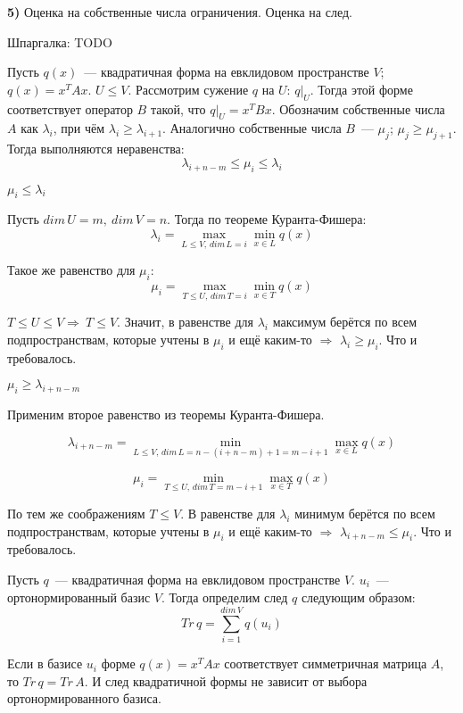 {\bf5)} Оценка на собственные числа ограничения. Оценка на след.

Шпаргалка: TODO


Пусть $q(x)$~--- квадратичная форма на евклидовом пространстве $V$; $q(x) = x^TAx$. $U \le V$. Рассмотрим сужение $q$ на $U$: $q|_U$. Тогда этой форме соответствует оператор $B$ такой, что $q|_U = x^TBx$. Обозначим собственные числа $A$ как $\lambda_i$, при чём $\lambda_i \ge \lambda_{i+1}$. Аналогично собственные числа $B$~--- $\mu_j$; $\mu_j\ge \mu_{j + 1}$. Тогда выполняются неравенства:
$$
\lambda_{i+n-m}\le\mu_i\le\lambda_i
$$

\proofname

$\mu_i\le\lambda_i$

Пусть $dim\,U = m,\ dim\,V = n$. Тогда по теореме Куранта-Фишера:
$$
\lambda_i = \max\limits_{L \le V,\,dim\,L = i} \min\limits_{x\in L} q(x) 
$$

Такое же равенство для $\mu_i$:
$$
\mu_i = \max\limits_{T \le U,\,dim\,T = i} \min\limits_{x\in T} q(x) 
$$

$T\le U\le V\Rightarrow\ T\le V$. Значит, в равенстве для $\lambda_i$ максимум берётся по всем подпространствам, которые учтены в $\mu_i$ и ещё каким-то $\Rightarrow$ $\lambda_i \ge \mu_i$. Что и требовалось.

$\mu_i \ge \lambda_{i + n - m}$

Применим второе равенство из теоремы Куранта-Фишера.

$$
\lambda_{i+n-m} = \min\limits_{L \le V,\,dim\,L = n - (i + n - m) + 1 = m - i + 1} \max\limits_{x\in L} q(x) 
$$

$$
\mu_i = \min\limits_{T \le U,\,dim\,T = m - i + 1} \max\limits_{x\in T} q(x) 
$$

По тем же соображениям $T \le V$. В равенстве для $\lambda_i$ минимум берётся по всем подпространствам, которые учтены в $\mu_i$ и ещё каким-то $\Rightarrow$ $\lambda_{i + n - m}\le \mu_i$. Что и требовалось.


Пусть $q$~--- квадратичная форма на евклидовом пространстве $V$. $u_i$~--- ортонормированный базис $V$. Тогда определим след $q$ следующим образом:
$$
Tr\,q=\sum\limits_{i=1}^{dim\,V} q(u_i)
$$


Если в базисе $u_i$ форме $q(x)=x^TAx$ соответствует симметричная матрица $A$, то $Tr\,q=Tr\,A$. И след квадратичной формы не зависит от выбора ортонормированного базиса.


